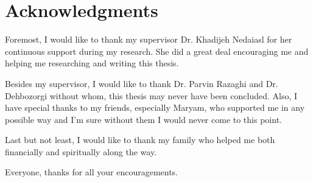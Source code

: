 \section*{\centering Acknowledgments}
Foremost, I would like to thank my supervisor Dr. Khadijeh Nedaiasl for her continuous support during my research. She did a great deal encouraging me and helping me researching and writing this thesis.

Besides my supervisor, I would like to thank Dr. Parvin Razaghi and Dr. Dehbozorgi without whom, this thesis may never have been concluded.
Also, I have special thanks to my friends, especially Maryam, who supported me in any possible way and I'm sure without them I would never come to this point. 

Last but not least, I would like to thank my family who helped me both financially and spiritually along the way.


Everyone, thanks for all your encouragements. 
\newpage
\begin{latinabstract}

\end{latinabstract}
% 
